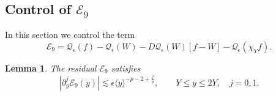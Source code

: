 \documentclass[11pt]{amsart}
\newtheorem{lemma}[theorem]{Lemma}
\theoremstyle{definition}
\theoremstyle{remark}
\numberwithin{equation}{section}
\newcommand{\mc}[1]{\mathcal{#1}}
\newcommand{\ang}[1]{\langle #1 \rangle}
\begin{document}
\subsection{Control of \texorpdfstring{$\mc{E}_9$}{E9}}

In this section we control the term
\[\mc{E}_9 = \mc{Q}_\epsilon(f)-\mc{Q}_\epsilon(W)
        -D\mc{Q}_\epsilon(W)[f-W]-\mc{Q}_\epsilon(\chi_Y f).\]

\begin{lemma}\label{lem:approx_E9}
    The residual $\mc{E}_9$ satisfies
    \begin{equation}\label{eqn:approx_E9_bound}
        |\partial_y^j\mc{E}_9(y)|
        \lesssim\epsilon\ang{y}^{-p-2+\frac{j}{p}},
        \qquad Y\leq y\leq2Y,\quad j=0,1.
    \end{equation}
\end{lemma}
\end{document}
